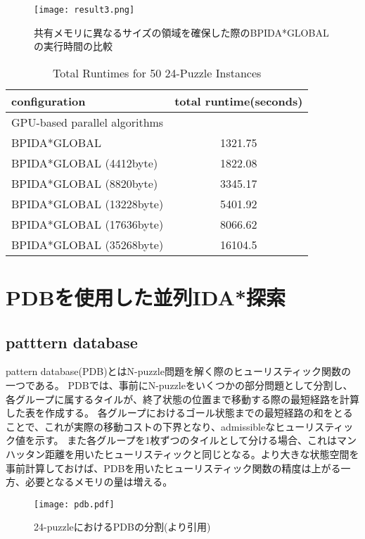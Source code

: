 \documentclass[a4paper,11pt,oneside,openany]{jsbook}
\begin{document}
\begin{figure}[H]
\begin{center}
\texttt{[image: result3.png]}
\caption{共有メモリに異なるサイズの領域を確保した際のBPIDA*GLOBALの実行時間の比較}
\end{center}
\end{figure}

\begin{table}[H]
\centering
\caption{Total Runtimes for 50 24-Puzzle Instances}
\label{my-label}
\begin{tabular}{|l|c|}
\hline
configuration & \multicolumn{1}{l|}{total runtime(seconds)} \\ \hline
\multicolumn{2}{|l|}{GPU-based parallel algorithms} \\ \hline
BPIDA*GLOBAL    & 1321.75  \\
BPIDA*GLOBAL (4412byte) & 1822.08  \\
BPIDA*GLOBAL (8820byte) &  3345.17 \\
BPIDA*GLOBAL (13228byte) & 5401.92 \\
BPIDA*GLOBAL (17636byte) & 8066.62 \\
BPIDA*GLOBAL (35268byte) & 16104.5 \\ \hline
\end{tabular}
\end{table}




\chapter{PDBを使用した並列IDA*探索}
\section{patttern database}
pattern database(PDB)\cite{CS98}とはN-puzzle問題を解く際のヒューリスティック関数の一つである。
PDBでは、事前にN-puzzleをいくつかの部分問題として分割し、各グループに属するタイルが、終了状態の位置まで移動する際の最短経路を計算した表を作成する。
各グループにおけるゴール状態までの最短経路の和をとることで、これが実際の移動コストの下界となり、admissibleなヒューリスティック値を示す。
また各グループを1枚ずつのタイルとして分ける場合、これはマンハッタン距離を用いたヒューリスティックと同じとなる。より大きな状態空間を事前計算しておけば、PDBを用いたヒューリスティック関数の精度は上がる一方、必要となるメモリの量は増える。

\begin{figure}[H]
\begin{center}
\texttt{[image: pdb.pdf]}
\caption{24-puzzleにおけるPDBの分割(\cite{PDB}より引用)}
\end{center}
\end{figure}
\end{document}
